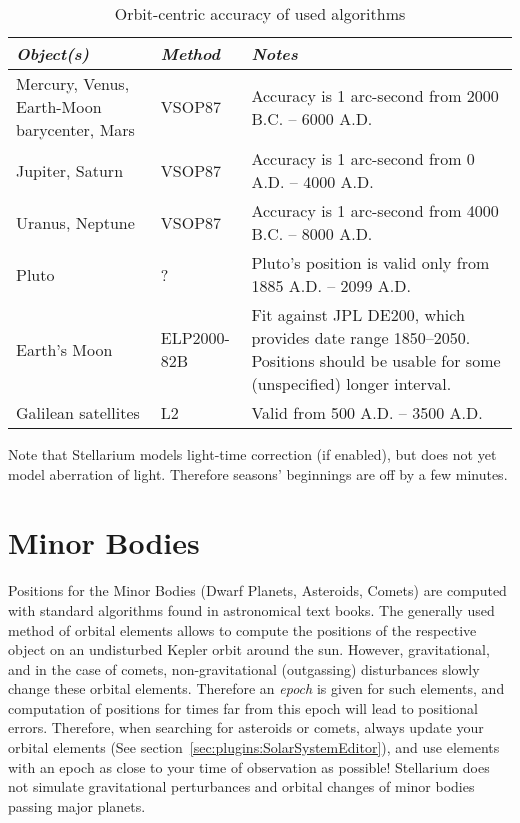 \begin{table}[tb]
\begin{tabularx}{\textwidth}{X|l|X}
\toprule
\emph{Object(s)} & \emph{Method} & \emph{Notes}\tabularnewline
\midrule
Mercury, Venus, Earth-Moon barycenter, Mars & VSOP87 & Accuracy is 1 arc-second from 2000 B.C. -- 6000 A.D. \\%
Jupiter, Saturn                             & VSOP87 & Accuracy is 1 arc-second from 0 A.D. -- 4000 A.D.    \\%
Uranus, Neptune                             & VSOP87 & Accuracy is 1 arc-second from 4000 B.C. -- 8000 A.D. \\%
Pluto                                       & ?      & Pluto's position is valid only from 1885 A.D. -- 2099 A.D.\\%
Earth's Moon                                & ELP2000-82B & Fit against JPL DE200, which provides date range 1850--2050. 
                                                            Positions should be usable for some (unspecified) longer interval. \\%
Galilean satellites                         & L2     & Valid from 500 A.D. -- 3500 A.D.\\ 
\bottomrule
\end{tabularx}
\caption{Orbit-centric accuracy of used algorithms}
\label{tab:Accuracy:Planets}
\end{table}

\noindent Note that Stellarium models light-time correction (if enabled), but does not yet model aberration of light. 
Therefore seasons' beginnings are off by a few minutes.

\section{Minor Bodies}
\label{sec:Accuracy:MinorBodies}

Positions for the Minor Bodies (Dwarf Planets, Asteroids, Comets) are
computed with standard algorithms found in astronomical text
books. The generally used method of orbital elements allows to compute
the positions of the respective object on an undisturbed Kepler orbit
around the sun. However, gravitational, and in the case of comets,
non-gravitational (outgassing) disturbances slowly change these
orbital elements. Therefore an \emph{epoch} is given for such
elements, and computation of positions for times far from this epoch
will lead to positional errors. Therefore, when searching for
asteroids or comets, always update your orbital elements (See section~\ref{sec:plugins:SolarSystemEditor}), 
and use elements with an epoch as close to your time of observation as
possible! Stellarium does not simulate gravitational perturbances and
orbital changes of minor bodies passing major planets.

